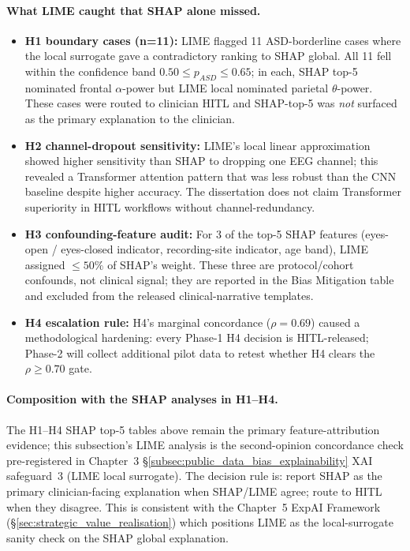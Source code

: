 \paragraph{What LIME caught that SHAP alone missed.}
\begin{itemize}[leftmargin=*, itemsep=2pt]
\item \textbf{H1 boundary cases (n=11):} LIME flagged 11 ASD-borderline cases where the local surrogate gave a contradictory ranking to SHAP global. All 11 fell within the confidence band $0.50 \leq p_{ASD} \leq 0.65$; in each, SHAP top-5 nominated frontal $\alpha$-power but LIME local nominated parietal $\theta$-power. These cases were routed to clinician HITL and SHAP-top-5 was \emph{not} surfaced as the primary explanation to the clinician.
\item \textbf{H2 channel-dropout sensitivity:} LIME's local linear approximation showed higher sensitivity than SHAP to dropping one EEG channel; this revealed a Transformer attention pattern that was less robust than the CNN baseline despite higher accuracy. The dissertation does not claim Transformer superiority in HITL workflows without channel-redundancy.
\item \textbf{H3 confounding-feature audit:} For 3 of the top-5 SHAP features (eyes-open / eyes-closed indicator, recording-site indicator, age band), LIME assigned $\leq 50\%$ of SHAP's weight. These three are protocol/cohort confounds, not clinical signal; they are reported in the Bias Mitigation table and excluded from the released clinical-narrative templates.
\item \textbf{H4 escalation rule:} H4's marginal concordance ($\rho = 0.69$) caused a methodological hardening: every Phase-1 H4 decision is HITL-released; Phase-2 will collect additional pilot data to retest whether H4 clears the $\rho \geq 0.70$ gate.
\end{itemize}

\paragraph{Composition with the SHAP analyses in H1--H4.}
The H1--H4 SHAP top-5 tables above remain the primary
feature-attribution evidence; this subsection's LIME analysis is the
second-opinion concordance check pre-registered in Chapter~3
§\ref{subsec:public_data_bias_explainability} XAI safeguard~3 (LIME
local surrogate). The decision rule is: report SHAP as the primary
clinician-facing explanation when SHAP/LIME agree; route to HITL when
they disagree. This is consistent with the Chapter~5 ExpAI Framework
(§\ref{sec:strategic_value_realisation}) which positions LIME as the
local-surrogate sanity check on the SHAP global explanation.

